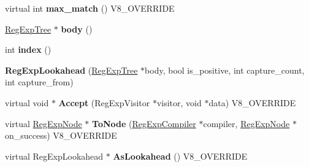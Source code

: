 \begin{DoxyCompactItemize}
\item 
\hypertarget{classv8_1_1internal_1_1_v8___f_i_n_a_l_a0b9dd74bfd4f1172c26a072c44da8669}{}virtual int {\bfseries max\+\_\+match} () V8\+\_\+\+O\+V\+E\+R\+R\+I\+D\+E\label{classv8_1_1internal_1_1_v8___f_i_n_a_l_a0b9dd74bfd4f1172c26a072c44da8669}

\item 
\hypertarget{classv8_1_1internal_1_1_v8___f_i_n_a_l_a7d68da380b730fcd95eb41b943743a8b}{}\hyperlink{classv8_1_1internal_1_1_reg_exp_tree}{Reg\+Exp\+Tree} $\ast$ {\bfseries body} ()\label{classv8_1_1internal_1_1_v8___f_i_n_a_l_a7d68da380b730fcd95eb41b943743a8b}

\item 
\hypertarget{classv8_1_1internal_1_1_v8___f_i_n_a_l_ae5c4241a042c07df1f4d7fa6fb262023}{}int {\bfseries index} ()\label{classv8_1_1internal_1_1_v8___f_i_n_a_l_ae5c4241a042c07df1f4d7fa6fb262023}

\item 
\hypertarget{classv8_1_1internal_1_1_v8___f_i_n_a_l_ac77719ec9859d21fe0ec159f050911da}{}{\bfseries Reg\+Exp\+Lookahead} (\hyperlink{classv8_1_1internal_1_1_reg_exp_tree}{Reg\+Exp\+Tree} $\ast$body, bool is\+\_\+positive, int capture\+\_\+count, int capture\+\_\+from)\label{classv8_1_1internal_1_1_v8___f_i_n_a_l_ac77719ec9859d21fe0ec159f050911da}

\item 
\hypertarget{classv8_1_1internal_1_1_v8___f_i_n_a_l_a5a421cb811caf33f244ce08fe3e5ac14}{}virtual void $\ast$ {\bfseries Accept} (Reg\+Exp\+Visitor $\ast$visitor, void $\ast$data) V8\+\_\+\+O\+V\+E\+R\+R\+I\+D\+E\label{classv8_1_1internal_1_1_v8___f_i_n_a_l_a5a421cb811caf33f244ce08fe3e5ac14}

\item 
\hypertarget{classv8_1_1internal_1_1_v8___f_i_n_a_l_aa183d4adede0c6af0c092eeebf59c194}{}virtual \hyperlink{classv8_1_1internal_1_1_reg_exp_node}{Reg\+Exp\+Node} $\ast$ {\bfseries To\+Node} (\hyperlink{classv8_1_1internal_1_1_reg_exp_compiler}{Reg\+Exp\+Compiler} $\ast$compiler, \hyperlink{classv8_1_1internal_1_1_reg_exp_node}{Reg\+Exp\+Node} $\ast$on\+\_\+success) V8\+\_\+\+O\+V\+E\+R\+R\+I\+D\+E\label{classv8_1_1internal_1_1_v8___f_i_n_a_l_aa183d4adede0c6af0c092eeebf59c194}

\item 
\hypertarget{classv8_1_1internal_1_1_v8___f_i_n_a_l_ad777518f8cfb2398decd587661dd03fe}{}virtual Reg\+Exp\+Lookahead $\ast$ {\bfseries As\+Lookahead} () V8\+\_\+\+O\+V\+E\+R\+R\+I\+D\+E\label{classv8_1_1internal_1_1_v8___f_i_n_a_l_ad777518f8cfb2398decd587661dd03fe}


\end{DoxyCompactItemize}
